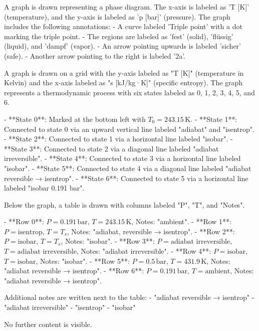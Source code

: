 A graph is drawn representing a phase diagram. The x-axis is labeled as 'T [K]' (temperature), and the y-axis is labeled as 'p [bar]' (pressure). The graph includes the following annotations:  
- A curve labeled 'Triple point' with a dot marking the triple point.  
- The regions are labeled as 'fest' (solid), 'flüssig' (liquid), and 'dampf' (vapor).  
- An arrow pointing upwards is labeled 'sicher' (safe).  
- Another arrow pointing to the right is labeled '2a'.

A graph is drawn on a grid with the y-axis labeled as "T [K]" (temperature in Kelvin) and the x-axis labeled as "s [kJ/kg·K]" (specific entropy). The graph represents a thermodynamic process with six states labeled as 0, 1, 2, 3, 4, 5, and 6.  

- **State 0**: Marked at the bottom left with \( T_0 = 243.15 \, \text{K} \).  
- **State 1**: Connected to state 0 via an upward vertical line labeled "adiabat" and "isentrop".  
- **State 2**: Connected to state 1 via a horizontal line labeled "isobar".  
- **State 3**: Connected to state 2 via a diagonal line labeled "adiabat irreversible".  
- **State 4**: Connected to state 3 via a horizontal line labeled "isobar".  
- **State 5**: Connected to state 4 via a diagonal line labeled "adiabat reversible → isentrop".  
- **State 6**: Connected to state 5 via a horizontal line labeled "isobar 0.191 bar".  

Below the graph, a table is drawn with columns labeled "P", "T", and "Notes".  

- **Row 0**: \( P = 0.191 \, \text{bar} \), \( T = 243.15 \, \text{K} \), Notes: "ambient".  
- **Row 1**: \( P = \text{isentrop} \), \( T = T_s \), Notes: "adiabat, reversible → isentrop".  
- **Row 2**: \( P = \text{isobar} \), \( T = T_s \), Notes: "isobar".  
- **Row 3**: \( P = \text{adiabat irreversible} \), \( T = \text{adiabat irreversible} \), Notes: "adiabat irreversible".  
- **Row 4**: \( P = \text{isobar} \), \( T = \text{isobar} \), Notes: "isobar".  
- **Row 5**: \( P = 0.5 \, \text{bar} \), \( T = 431.9 \, \text{K} \), Notes: "adiabat reversible → isentrop".  
- **Row 6**: \( P = 0.191 \, \text{bar} \), \( T = \text{ambient} \), Notes: "adiabat reversible → isentrop".  

Additional notes are written next to the table:  
- "adiabat reversible → isentrop"  
- "adiabat irreversible"  
- "isentrop"  
- "isobar"  

No further content is visible.